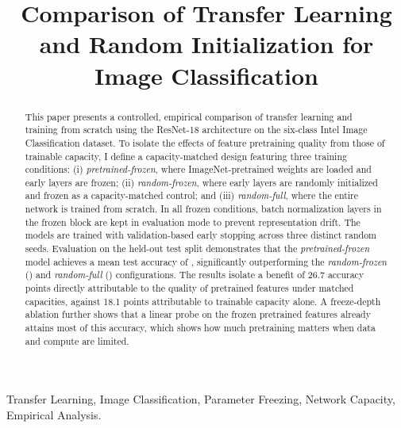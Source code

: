 \documentclass[conference]{IEEEtran}
\begin{document}
\title{Comparison of Transfer Learning and Random Initialization for Image Classification}

\author{
}

\maketitle

\begin{abstract}
This paper presents a controlled, empirical comparison of transfer learning and training from scratch using the ResNet-18 architecture on the six-class Intel Image Classification dataset. To isolate the effects of feature pretraining quality from those of trainable capacity, I define a capacity-matched design featuring three training conditions: (i) \textit{pretrained-frozen}, where ImageNet-pretrained weights are loaded and early layers are frozen; (ii) \textit{random-frozen}, where early layers are randomly initialized and frozen as a capacity-matched control; and (iii) \textit{random-full}, where the entire network is trained from scratch. In all frozen conditions, batch normalization layers in the frozen block are kept in evaluation mode to prevent representation drift. The models are trained with validation-based early stopping across three distinct random seeds. Evaluation on the held-out test split demonstrates that the \textit{pretrained-frozen} model achieves a mean test accuracy of \pretrainedfrozenTestAccMean, significantly outperforming the \textit{random-frozen} (\randomfrozenTestAccMean) and \textit{random-full} (\randomfullTestAccMean) configurations. The results isolate a benefit of 26.7 accuracy points directly attributable to the quality of pretrained features under matched capacities, against 18.1 points attributable to trainable capacity alone. A freeze-depth ablation further shows that a linear probe on the frozen pretrained features already attains most of this accuracy, which shows how much pretraining matters when data and compute are limited.
\end{abstract}

\begin{IEEEkeywords}
Transfer Learning, Image Classification, Parameter Freezing, Network Capacity, Empirical Analysis.
\end{IEEEkeywords}
\end{document}
